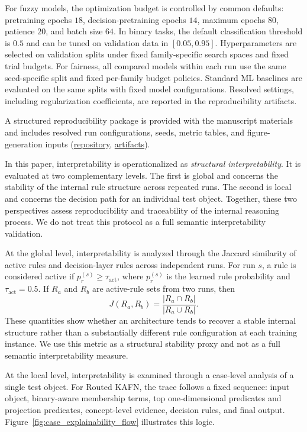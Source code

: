 \documentclass[runningheads]{llncs}
\begin{document}
For fuzzy models, the optimization budget is controlled by common defaults: pretraining epochs $18$, decision-pretraining epochs $14$, maximum epochs $80$, patience $20$, and batch size $64$. In binary tasks, the default classification threshold is $0.5$ and can be tuned on validation data in $[0.05,0.95]$. Hyperparameters are selected on validation splits under fixed family-specific search spaces and fixed trial budgets. For fairness, all compared models within each run use the same seed-specific split and fixed per-family budget policies. Standard ML baselines are evaluated on the same splits with fixed model configurations. Resolved settings, including regularization coefficients, are reported in the reproducibility artifacts.

A structured reproducibility package is provided with the manuscript materials and includes resolved run configurations, seeds, metric tables, and figure-generation inputs (\href{https://github.com/lebedeffson/deep-neuro-fuzzy}{repository}, \href{https://github.com/lebedeffson/deep-neuro-fuzzy/tree/main/docs/artifacts}{artifacts}).

In this paper, interpretability is operationalized as \textit{structural interpretability}. It is evaluated at two complementary levels. The first is global and concerns the stability of the internal rule structure across repeated runs. The second is local and concerns the decision path for an individual test object. Together, these two perspectives assess reproducibility and traceability of the internal reasoning process. We do not treat this protocol as a full semantic interpretability validation.

At the global level, interpretability is analyzed through the Jaccard similarity of active rules and decision-layer rules across independent runs. For run $s$, a rule is considered active if $p_r^{(s)}\ge \tau_{\mathrm{act}}$, where $p_r^{(s)}$ is the learned rule probability and $\tau_{\mathrm{act}}=0.5$. If $R_a$ and $R_b$ are active-rule sets from two runs, then
\[
J(R_a,R_b)=\frac{|R_a\cap R_b|}{|R_a\cup R_b|}.
\]
These quantities show whether an architecture tends to recover a stable internal structure rather than a substantially different rule configuration at each training instance. We use this metric as a structural stability proxy and not as a full semantic interpretability measure.

At the local level, interpretability is examined through a case-level analysis of a single test object. For Routed KAFN, the trace follows a fixed sequence: input object, binary-aware membership terms, top one-dimensional predicates and projection predicates, concept-level evidence, decision rules, and final output. Figure~\ref{fig:case_explainability_flow} illustrates this logic.
\end{document}
